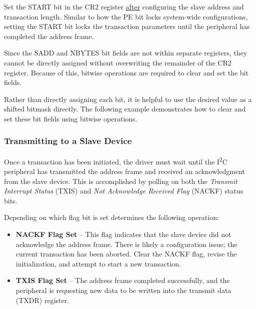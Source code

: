 \documentclass[openany,11pt,fleqn]{book} %
\newcommand{\code}[3]{
    \begin{figure}[]
        \colorbox{gray!20!white}{
            \parbox{\linewidth-2\fboxsep} {
                \centering 
                
            }
        }
        \caption{#2}
        \label{#3}
    \end{figure}
}
\begin{document}
    \begin{warning}
        Set the START bit in the CR2 register \underline{after} configuring the slave address and transaction length. Similar to how the PE bit locks system-wide configurations, setting the START bit locks the transaction parameters until the peripheral has completed the address frame. 
    \end{warning}
    
    \begin{example}
       
        Since the SADD and NBYTES bit fields are not within separate registers, they cannot be directly assigned without overwriting the remainder of the CR2 register. Because of this, bitwise operations are required to clear and set the bit fields. 
        
        Rather than directly assigning each bit, it is helpful to use the desired value as a shifted bitmask directly. The following example demonstrates how to clear and set these bit fields using bitwise operations. 
        
         \smallskip
         \colorbox{gray!20!white}{
             \parbox{\linewidth-2\fboxsep} {
                 \centering 
                 
             }
         }
     
         \smallskip
    \end{example}
    
    \subsubsection{Transmitting to a Slave Device}
        Once a transaction has been initiated, the driver must wait until the I\textsuperscript{2}C peripheral has transmitted the address frame and received an acknowledgment from the slave device. This is accomplished by polling on both the \textit{Transmit Interrupt Status} (TXIS) and \textit{Not Acknowledge Received Flag} (NACKF) status bits. 
        
        Depending on which flag bit is set determines the following operation:
        \begin{itemize}
            \item \textbf{NACKF Flag Set} -- This flag indicates that the slave device did not acknowledge the address frame. There is likely a configuration issue; the current transaction has been aborted. Clear the NACKF flag, revise the initialization, and attempt to start a new transaction. 
            \item \textbf{TXIS Flag Set} -- The address frame completed successfully, and the peripheral is requesting new data to be written into the transmit data (TXDR) register. 
        \end{itemize}
        
\end{document}
